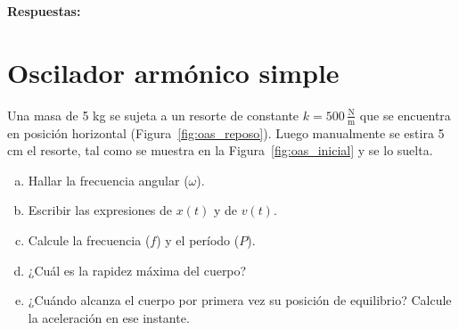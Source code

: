 \documentclass[addpoints]{exam}
\newcommand{\rtas}{\textbf{Respuestas: }}
\begin{document}
\begin{questions}
    \rtas

    \pagebreak

    \section{Oscilador armónico simple}

    \question Una masa de 5 kg se sujeta a un resorte de constante $k = 500 \, \frac{\text{N}}{\text{m}}$ que se encuentra en posición horizontal (Figura~\ref{fig:oas_reposo}). Luego manualmente se estira 5 cm el resorte, tal como se muestra en la Figura~\ref{fig:oas_inicial} y se lo suelta. 
    \begin{enumerate}[a)]
        \item Hallar la frecuencia angular ($\omega$).
        \item Escribir las expresiones de $x(t)$ y de $v(t)$.
        \item Calcule la frecuencia ($f$) y el período ($P$).
        \item ¿Cuál es la rapidez máxima del cuerpo?
        \item ¿Cuándo alcanza el cuerpo por primera vez su posición de equilibrio? Calcule la aceleración en ese instante.
    \end{enumerate}


\end{questions}
\end{document}
